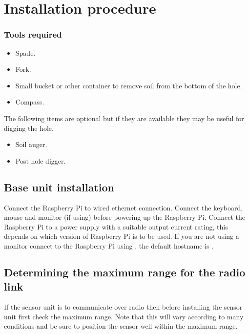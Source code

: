 \chapter{Installation procedure}

\subsection{Tools required}

\begin{itemize}
\item Spade.
\item Fork.
\item Small bucket or other container to remove soil from the bottom
  of the hole.
\item Compass.
\end{itemize}

The following items are optional but if they are available they may be
useful for digging the hole.
\begin{itemize}
\item Soil auger.
\item Post hole digger.
\end{itemize}

\section{Base unit installation}

Connect the Raspberry Pi to wired ethernet connection. Connect the
keyboard, mouse and monitor (if using) before powering up the
Raspberry Pi. Connect the Raspberry Pi to a  power supply with
a suitable output current rating, this depends on which version of
Raspberry Pi is to be used. If you are not using a monitor connect to
the Raspberry Pi using \ssh, the default hostname is
.


\section{Determining the maximum range for the radio link}
\label{sec:find-maximum-range}

If the sensor unit is to communicate over radio then before installing
the sensor unit first check the maximum range. Note that this will
vary according to many conditions and be sure to position the sensor
well within the maximum range.

